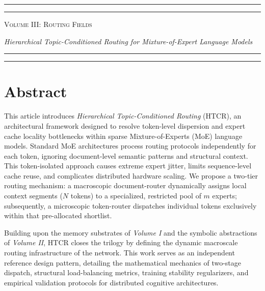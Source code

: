 \begin{titlepage}
    \thispagestyle{empty}
    
    \vfill
    \begin{center}
        \rule{\textwidth}{1.6pt}\vspace*{-\baselineskip}\vspace*{2pt}
        \rule{\textwidth}{0.4pt}\par\vspace{\baselineskip}
        {\Huge \scshape Volume III: Routing Fields}\par\vspace{0.2in}
        {\Large \itshape Hierarchical Topic-Conditioned Routing for Mixture-of-Expert Language Models}\par\vspace{3.2pt}
        \rule{\textwidth}{0.4pt}\vspace*{-\baselineskip}\vspace{3.2pt}
        \rule{\textwidth}{1.6pt}
    \end{center}
    \vfill
\end{titlepage}

\chapter*{Abstract}
This article introduces \textit{Hierarchical Topic-Conditioned Routing} (HTCR), an architectural framework designed to resolve token-level dispersion and expert cache locality bottlenecks within sparse Mixture-of-Experts (MoE) language models. Standard MoE architectures process routing protocols independently for each token, ignoring document-level semantic patterns and structural context. This token-isolated approach causes extreme expert jitter, limits sequence-level cache reuse, and complicates distributed hardware scaling. We propose a two-tier routing mechanism: a macroscopic document-router dynamically assigns local context segments ($N$ tokens) to a specialized, restricted pool of $m$ experts; subsequently, a microscopic token-router dispatches individual tokens exclusively within that pre-allocated shortlist. 

Building upon the memory substrates of \textit{Volume I} and the symbolic abstractions of \textit{Volume II}, HTCR closes the trilogy by defining the dynamic macroscale routing infrastructure of the network. This work serves as an independent reference design pattern, detailing the mathematical mechanics of two-stage dispatch, structural load-balancing metrics, training stability regularizers, and empirical validation protocols for distributed cognitive architectures.

